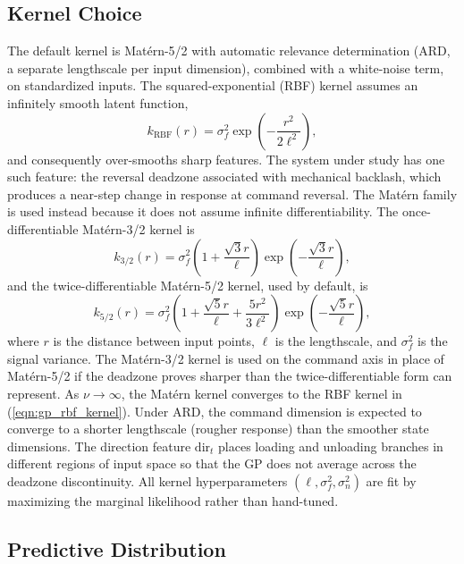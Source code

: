\subsection{Kernel Choice}

The default kernel is Mat\'ern-5/2 with automatic relevance determination (ARD, a separate lengthscale per input dimension), combined with a white-noise term, on standardized inputs. The squared-exponential (RBF) kernel assumes an infinitely smooth latent function,
\begin{equation}
  k_{\mathrm{RBF}}(r) = \sigma_f^2 \exp\!\left(-\frac{r^2}{2\ell^2}\right),
  \label{eqn:gp_rbf_kernel}
\end{equation}
and consequently over-smooths sharp features. The system under study has one such feature: the reversal deadzone associated with mechanical backlash, which produces a near-step change in response at command reversal. The Mat\'ern family is used instead because it does not assume infinite differentiability. The once-differentiable Mat\'ern-3/2 kernel is
\begin{equation}
  k_{3/2}(r) = \sigma_f^2\left(1+\frac{\sqrt{3}r}{\ell}\right)\exp\!\left(-\frac{\sqrt{3}r}{\ell}\right),
  \label{eqn:gp_matern32}
\end{equation}
and the twice-differentiable Mat\'ern-5/2 kernel, used by default, is
\begin{equation}
  k_{5/2}(r) = \sigma_f^2\left(1+\frac{\sqrt{5}r}{\ell}+\frac{5r^2}{3\ell^2}\right)\exp\!\left(-\frac{\sqrt{5}r}{\ell}\right),
  \label{eqn:gp_matern52}
\end{equation}
where $r$ is the distance between input points, $\ell$ is the lengthscale, and $\sigma_f^2$ is the signal variance. The Mat\'ern-3/2 kernel is used on the command axis in place of Mat\'ern-5/2 if the deadzone proves sharper than the twice-differentiable form can represent. As $\nu \to \infty$, the Mat\'ern kernel converges to the RBF kernel in (\ref{eqn:gp_rbf_kernel}). Under ARD, the command dimension is expected to converge to a shorter lengthscale (rougher response) than the smoother state dimensions. The direction feature $\mathrm{dir}_t$ places loading and unloading branches in different regions of input space so that the GP does not average across the deadzone discontinuity. All kernel hyperparameters $(\ell, \sigma_f^2, \sigma_n^2)$ are fit by maximizing the marginal likelihood rather than hand-tuned.

\subsection{Predictive Distribution}

